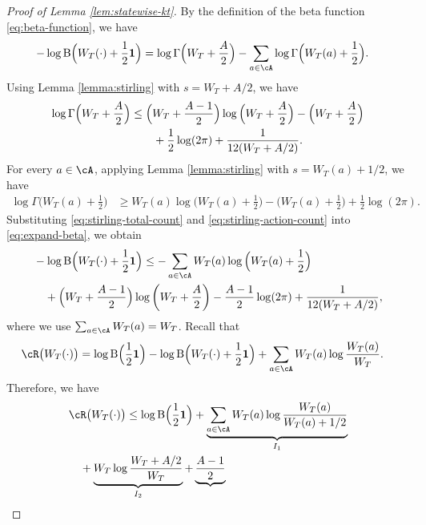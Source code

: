 \documentclass[11pt]{article}
\begin{document}
\begin{proof}[Proof of Lemma \ref{lem:statewise-kt}]
By the definition of the beta function \eqref{eq:beta-function}, we have
\begin{align}
    -\log
    \mathrm B\Big(
        W_T(\cdot)+\frac12\mathbf1
    \Big)
    &=
    \log\Gamma\Big(W_T+\frac A2\Big)
    -
    \sum_{a\in\cA}
    \log\Gamma\Big(W_T(a)+\frac12\Big).
    \label{eq:expand-beta}
\end{align}
Using Lemma \ref{lemma:stirling} with
$s=W_T+A/2$, we have
\begin{align}
    \log\Gamma\Big(W_T+\frac A2\Big)
    &\leq
    \Big(W_T+\frac{A-1}{2}\Big)
    \log\Big(W_T+\frac A2\Big)
    -
    \Big(W_T+\frac A2\Big)
    \notag\\
    &\qquad
    +
    \frac12\log(2\pi)
    +
    \frac{1}{12(W_T+A/2)}.
    \label{eq:stirling-total-count}
\end{align}
For every $a\in\cA$, applying Lemma \ref{lemma:stirling} with
$s=W_T(a)+1/2$, we have
\begin{align}
    \log\Gamma\Big(W_T(a)+\frac12\Big)
    &\geq
    W_T(a)\log\Big(W_T(a)+\frac12\Big)
    -
    \Big(W_T(a)+\frac12\Big)
    +
    \frac12\log(2\pi).
    \label{eq:stirling-action-count}
\end{align}
Substituting \eqref{eq:stirling-total-count} and
\eqref{eq:stirling-action-count} into \eqref{eq:expand-beta}, we obtain
\begin{align}
    &-\log
    \mathrm B\Big(
        W_T(\cdot)+\frac12\mathbf1
    \Big)
    \leq
    -
    \sum_{a\in\cA}
    W_T(a)\log\Big(W_T(a)+\frac12\Big)
    \notag\\
    &\quad+
    \Big(W_T+\frac{A-1}{2}\Big)
    \log\left(W_T+\frac A2\right)
    \notag-
    \frac{A-1}{2}\log(2\pi)
    +
    \frac{1}{12(W_T+A/2)},\notag
\end{align}
where we use $\sum_{a\in\cA}W_T(a)=W_T$. Recall that
\begin{align*}
    \cR\bigl(W_T(\cdot)\bigr)
    &=
    \log\mathrm B\Big(\frac12\mathbf1\Big)
    -
    \log\mathrm B\Big(
        W_T(\cdot)+\frac12\mathbf1
    \Big)
    +
    \sum_{a\in\cA}
    W_T(a)\log\frac{W_T(a)}{W_T}.
\end{align*}
Therefore, we have
\begin{align}
    &\cR\bigl(W_T(\cdot)\bigr)
    \leq
    \log\mathrm B\Big(\frac12\mathbf1\Big)
    +
    \underbrace{\sum_{a\in\cA}
    W_T(a)
    \log
    \frac{W_T(a)}{W_T(a)+1/2}}_{I_1}
    \notag\\
    &\quad+
    \underbrace{W_T
    \log\frac{W_T+A/2}{W_T}}_{I_2}
    +
    \underbrace{\frac{A-1}{2}
}
\end{align}
\end{proof}
\end{document}
